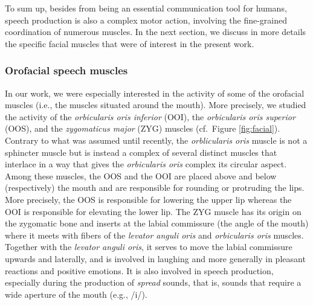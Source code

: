 \documentclass[a4paper,12pt,twoside,openright,oldfontcommands]{memoir}
\begin{document}
To sum up, besides from being an essential communication tool for humans, speech production is also a complex motor action, involving the fine-grained coordination of numerous muscles. In the next section, we discuss in more details the specific facial muscles that were of interest in the present work.

\hypertarget{orofacial-speech-muscles}{%
\subsubsection{Orofacial speech muscles}\label{orofacial-speech-muscles}}

In our work, we were especially interested in the activity of some of the orofacial muscles (i.e., the muscles situated around the mouth). More precisely, we studied the activity of the \emph{orbicularis oris inferior} (OOI), the \emph{orbicularis oris superior} (OOS), and the \emph{zygomaticus major} (ZYG) muscles (cf.~Figure \ref{fig:facial}). Contrary to what was assumed until recently, the \emph{orblicularis oris} muscle is not a sphincter muscle but is instead a complex of several distinct muscles that interlace in a way that gives the \emph{orbicularis oris} complex its circular aspect. Among these muscles, the OOS and the OOI are placed above and below (respectively) the mouth and are responsible for rounding or protruding the lips. More precisely, the OOS is responsible for lowering the upper lip whereas the OOI is responsible for elevating the lower lip. The ZYG muscle has its origin on the zygomatic bone and inserts at the labial commissure (the angle of the mouth) where it meets with fibers of the \emph{levator anguli oris} and \emph{orbicularis oris} muscles. Together with the \emph{levator anguli oris}, it serves to move the labial commissure upwards and laterally, and is involved in laughing and more generally in pleasant reactions and positive emotions. It is also involved in speech production, especially during the production of \emph{spread} sounds, that is, sounds that require a wide aperture of the mouth (e.g., /i/).
\end{document}
